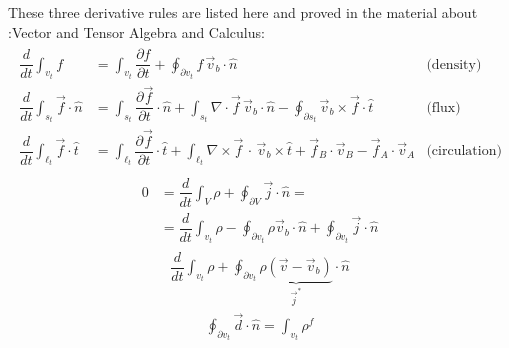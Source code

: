 \documentclass[letterpaper,10pt,english]{jupyterBook}
\begin{document}
\sphinxAtStartPar
These three derivative rules are listed here and proved in the material about :Vector and Tensor Algebra and Calculus:
\begin{equation*}
\begin{split}\begin{aligned}
  \dfrac{d}{dt} \int_{v_t} f & = \int_{v_t} \dfrac{\partial f}{\partial t} + \oint_{\partial v_t} f \, \vec{v}_b \cdot \hat{n} & \text{(density)} \\
  \dfrac{d}{dt} \int_{s_t} \vec{f} \cdot \hat{n} & = \int_{s_t} \dfrac{\partial \vec{f}}{\partial t} \cdot \hat{n} + \int_{s_t} \nabla \cdot \vec{f} \, \vec{v}_b \cdot \hat{n} - \oint_{\partial s_t} \vec{v}_b \times \vec{f} \cdot \hat{t} & \text{(flux)} \\
  \dfrac{d}{dt} \int_{\ell_t} \vec{f} \cdot \hat{t} & = \int_{\ell_t} \dfrac{\partial \vec{f}}{\partial t} \cdot \hat{t} + \int_{\ell_t} \nabla \times \vec{f} \, \cdot \, \vec{v}_b \times \hat{t} + \vec{f}_B \cdot \vec{v}_B - \vec{f}_A \cdot \vec{v}_A & \text{(circulation)}
\end{aligned}\end{split}
\end{equation*}
\sphinxAtStartPar
{}
\begin{equation*}
\begin{split}\begin{aligned}
   0 & = \dfrac{d}{dt} \int_{V} \rho + \oint_{\partial V} \vec{j} \cdot \hat{n} = \\
   & = \dfrac{d}{dt} \int_{v_t} \rho - \oint_{\partial v_t } \rho \vec{v}_b \cdot \hat{n} + \oint_{\partial v_t} \vec{j} \cdot \hat{n} 
\end{aligned}\end{split}
\end{equation*}\begin{equation*}
\begin{split}
    \dfrac{d}{dt} \int_{v_t} \rho + \oint_{\partial v_t} \underbrace{\rho (\vec{v} - \vec{v}_b)}_{\vec{j}^*} \cdot \hat{n} 
\end{split}
\end{equation*}
\sphinxAtStartPar
{}
\begin{equation*}
\begin{split}
    \oint_{\partial v_t} \vec{d} \cdot \hat{n} = \int_{v_t} \rho^f
\end{split}
\end{equation*}
\end{document}
